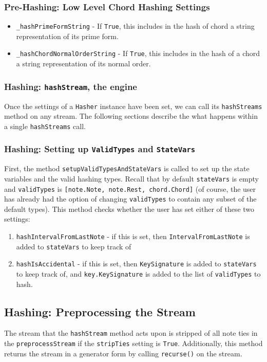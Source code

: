         \subsubsection{Pre-Hashing: Low Level Chord Hashing Settings}
                    \begin{itemize}
                    \item \texttt{\_hashPrimeFormString} - If \texttt{True}, this includes in the hash of chord a string representation of its prime form.
                    \item \texttt{\_hashChordNormalOrderString} - If \texttt{True}, this includes in the hash of a chord a string representation of its normal order. 
                    \end{itemize}
        \subsubsection{Hashing: \texttt{hashStream}, the engine}
        Once the settings of a \texttt{Hasher} instance have been set, we can call its \texttt{hashStreams} method on any stream. The following sections describe the what happens within a single \texttt{hashStreams} call. 
        \subsubsection{Hashing: Setting up \texttt{ValidTypes} and \texttt{StateVars}}
        First, the method \texttt{setupValidTypesAndStateVars} is called to set up the state variables and the valid hashing types. Recall that by default \texttt{stateVars} is empty and \texttt{validTypes} is \texttt{[note.Note, note.Rest, chord.Chord]} (of course, the user has already had the option of changing \texttt{validTypes} to contain any subset of the default types). This method checks whether the user has set either of these two settings:
        \begin{enumerate}
        \item \texttt{hashIntervalFromLastNote} - if this is set, then \texttt{IntervalFromLastNote} is added to \texttt{stateVars} to keep track of
        \item \texttt{hashIsAccidental} - if this is set, then \texttt{KeySignature} is added to \texttt{stateVars} to keep track of, and \texttt{key.KeySignature} is added to the list of \texttt{validTypes} to hash. 
        \end{enumerate}
        
        \subsection{Hashing: Preprocessing the Stream}
        The stream that the \texttt{hashStream} method acts upon is stripped of all note ties in the \texttt{preprocessStream} if the \texttt{stripTies} setting is \texttt{True}. Additionally, this method returns the stream in a generator form by calling \texttt{recurse()} on the stream. 
        
